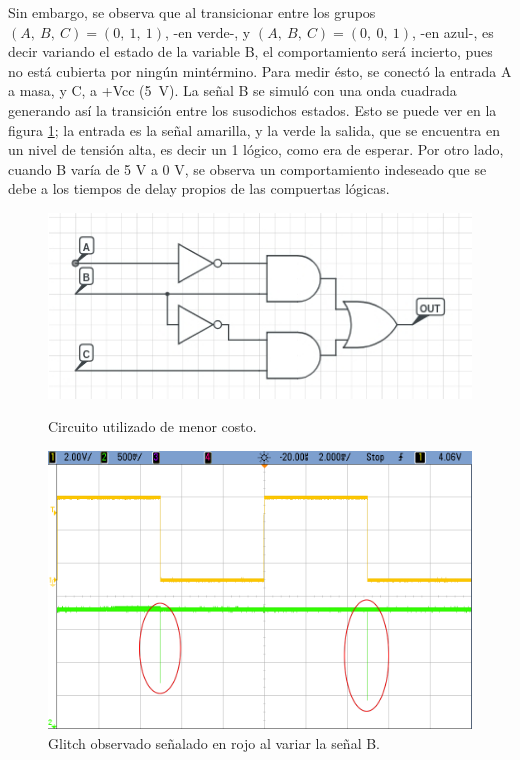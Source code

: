 Sin embargo, se observa que al transicionar entre los grupos $(A,~B,~C)=(0,~1,~1)$, -en verde-, y $(A,~B,~C)=(0,~0,~1)$, -en azul-, es decir variando el estado de la variable B, el comportamiento será incierto, pues no está cubierta por ningún mintérmino.
Para medir ésto, se conectó la entrada A a masa, y C, a +Vcc (5~V). La señal B se simuló con una onda cuadrada generando 
así la transición entre los susodichos estados. Esto se puede ver en la figura \ref{fig:glitch}; la entrada es la señal amarilla, y la verde la salida, que se encuentra en un nivel de tensión alta, es decir un 1 lógico, como era de esperar. 
Por otro lado, cuando B varía de 5 V a 0 V, se observa un comportamiento indeseado que se debe a los tiempos de delay propios de las compuertas lógicas.

\vspace{5mm}
\begin{figure}[H]
    \begin{minipage}{.49\linewidth}
        \centering
        \vspace{10mm}
        \includegraphics[width=.8\linewidth]{./circconglitches.jpg}
        \vspace{10mm}
        \caption{Circuito utilizado de menor costo.}
        \label{fig:circuito-con-glitches}
    \end{minipage}
    \begin{minipage}{.5\linewidth}
        \centering
        \includegraphics[width=\linewidth]{./glitch.png}
        \caption{Glitch observado señalado en rojo al variar la señal B.}
        \label{fig:glitch}
    \end{minipage}
\end{figure}

